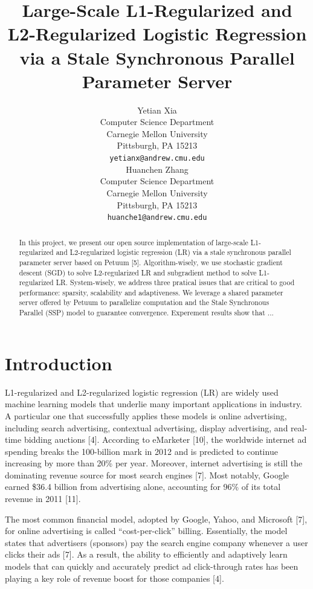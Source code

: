 \documentclass{article} %
\title{Large-Scale L1-Regularized and L2-Regularized Logistic Regression via a Stale Synchronous Parallel Parameter Server}
\author{
Yetian Xia\\
Computer Science Department\\
Carnegie Mellon University\\
Pittsburgh, PA 15213 \\
\texttt{yetianx@andrew.cmu.edu} \\
\And
Huanchen Zhang\\
Computer Science Department\\
Carnegie Mellon University\\
Pittsburgh, PA 15213\\
\texttt{huanche1@andrew.cmu.edu} \\
}
\begin{document}
\maketitle

\begin{abstract}

In this project, we present our open source implementation of large-scale L1-regularized and L2-regularized logistic regression (LR) via a stale synchronous parallel parameter server based on Petuum [5]. Algorithm-wisely, we use stochastic gradient descent (SGD) to solve L2-regularized LR and subgradient method to solve L1-regularized LR. System-wisely, we address three pratical issues that are critical to good performance: sparsity, scalability and adaptiveness. We leverage a shared parameter server offered by Petuum to parallelize computation and the Stale Synchronous Parallel (SSP) model to guarantee convergence. Experement results show that ...

\end{abstract}

\section{Introduction}

L1-regularized and L2-regularized logistic regression (LR) are widely used machine learning models that underlie many important applications in industry. A particular one that successfully applies these models is online advertising, including search advertising, contextual advertising, display advertising, and real-time bidding auctions [4]. According to eMarketer [10], the worldwide internet ad spending breaks the 100-billion mark in 2012 and is predicted to continue increasing by more than 20\% per year. Moreover, internet advertising is still the dominating revenue source for most search engines [7]. Most notably, Google earned \$36.4 billion from advertising alone, accounting for 96\% of its total revenue in 2011 [11].

The most common financial model, adopted by Google, Yahoo, and Microsoft [7], for online advertising is called “cost-per-click” billing. Essentially, the model states that advertisers (sponsors) pay the search engine company whenever a user clicks their ads [7]. As a result, the ability to efficiently and adaptively learn models that can quickly and accurately predict ad click-through rates has been playing a key role of revenue boost for those companies [4].
\end{document}
